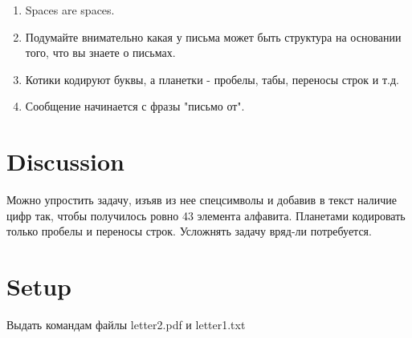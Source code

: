 \documentclass{article}
\begin{document}
	\begin{enumerate}
		\item Spaces are spaces.
		\item Подумайте внимательно какая у письма может быть структура на основании того, что вы знаете о письмах.
		\item Котики кодируют буквы, а планетки - пробелы, табы, переносы строк и т.д.
		\item Сообщение начинается с фразы "письмо от".
	\end{enumerate}
	
	\section{Discussion}
	
	Можно упростить задачу, изъяв из нее спецсимволы и добавив в текст наличие цифр так, чтобы получилось ровно 43 элемента алфавита. Планетами кодировать только пробелы и переносы строк.
	Усложнять задачу вряд-ли потребуется.
	
	\section{Setup}
	
	Выдать командам файлы letter2.pdf и letter1.txt
	
\end{document}
